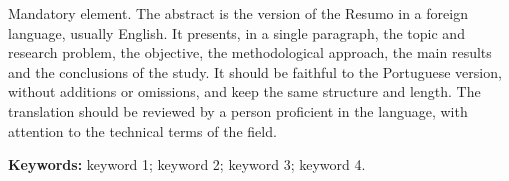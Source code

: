 \noindent
Mandatory element. The abstract is the version of the Resumo in a foreign language, usually English. It presents, in a single paragraph, the topic and research problem, the objective, the methodological approach, the main results and the conclusions of the study. It should be faithful to the Portuguese version, without additions or omissions, and keep the same structure and length. The translation should be reviewed by a person proficient in the language, with attention to the technical terms of the field.

\par\bigskip
\noindent\textbf{Keywords:} keyword 1; keyword 2; keyword 3; keyword 4.
